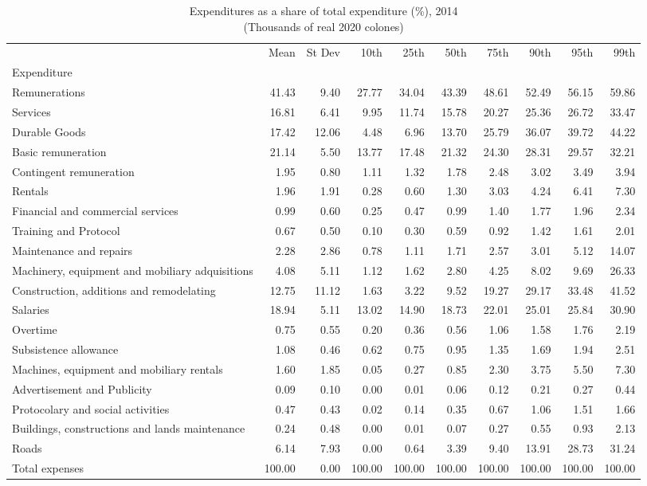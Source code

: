 \begin{table}[h]
\centering
\caption{Expenditures as a share of total expenditure (\%), 2014\\(Thousands of real 2020 colones)}
\begin{tabular}{lrrrrrrrrr}
\toprule
 & Mean & St Dev & 10th & 25th & 50th & 75th & 90th & 95th & 99th \\
Expenditure &  &  &  &  &  &  &  &  &  \\
\midrule
Remunerations & 41.43 & 9.40 & 27.77 & 34.04 & 43.39 & 48.61 & 52.49 & 56.15 & 59.86 \\
Services & 16.81 & 6.41 & 9.95 & 11.74 & 15.78 & 20.27 & 25.36 & 26.72 & 33.47 \\
Durable Goods & 17.42 & 12.06 & 4.48 & 6.96 & 13.70 & 25.79 & 36.07 & 39.72 & 44.22 \\
Basic remuneration & 21.14 & 5.50 & 13.77 & 17.48 & 21.32 & 24.30 & 28.31 & 29.57 & 32.21 \\
Contingent remuneration & 1.95 & 0.80 & 1.11 & 1.32 & 1.78 & 2.48 & 3.02 & 3.49 & 3.94 \\
Rentals & 1.96 & 1.91 & 0.28 & 0.60 & 1.30 & 3.03 & 4.24 & 6.41 & 7.30 \\
Financial and commercial services & 0.99 & 0.60 & 0.25 & 0.47 & 0.99 & 1.40 & 1.77 & 1.96 & 2.34 \\
Training and Protocol & 0.67 & 0.50 & 0.10 & 0.30 & 0.59 & 0.92 & 1.42 & 1.61 & 2.01 \\
Maintenance and repairs & 2.28 & 2.86 & 0.78 & 1.11 & 1.71 & 2.57 & 3.01 & 5.12 & 14.07 \\
Machinery, equipment and mobiliary adquisitions & 4.08 & 5.11 & 1.12 & 1.62 & 2.80 & 4.25 & 8.02 & 9.69 & 26.33 \\
Construction, additions and remodelating & 12.75 & 11.12 & 1.63 & 3.22 & 9.52 & 19.27 & 29.17 & 33.48 & 41.52 \\
Salaries & 18.94 & 5.11 & 13.02 & 14.90 & 18.73 & 22.01 & 25.01 & 25.84 & 30.90 \\
Overtime & 0.75 & 0.55 & 0.20 & 0.36 & 0.56 & 1.06 & 1.58 & 1.76 & 2.19 \\
Subsistence allowance & 1.08 & 0.46 & 0.62 & 0.75 & 0.95 & 1.35 & 1.69 & 1.94 & 2.51 \\
Machines, equipment and mobiliary rentals & 1.60 & 1.85 & 0.05 & 0.27 & 0.85 & 2.30 & 3.75 & 5.50 & 7.30 \\
Advertisement and Publicity & 0.09 & 0.10 & 0.00 & 0.01 & 0.06 & 0.12 & 0.21 & 0.27 & 0.44 \\
Protocolary and social activities & 0.47 & 0.43 & 0.02 & 0.14 & 0.35 & 0.67 & 1.06 & 1.51 & 1.66 \\
Buildings, constructions and lands maintenance & 0.24 & 0.48 & 0.00 & 0.01 & 0.07 & 0.27 & 0.55 & 0.93 & 2.13 \\
Roads & 6.14 & 7.93 & 0.00 & 0.64 & 3.39 & 9.40 & 13.91 & 28.73 & 31.24 \\
Total expenses & 100.00 & 0.00 & 100.00 & 100.00 & 100.00 & 100.00 & 100.00 & 100.00 & 100.00 \\
\bottomrule
\end{tabular}
\end{table}
